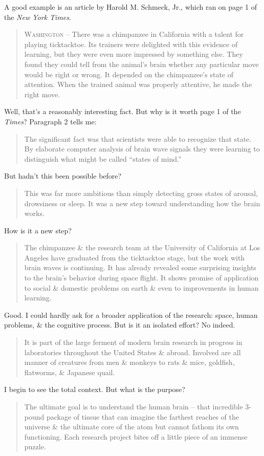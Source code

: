 \documentclass{article}
\begin{document}
A good example is an article by Harold M. Schmeck, Jr., which ran on page 1 of the \textit{New York Times}.
\begin{quotation}
	\textsc{Washington} -- There was a chimpanzee in California with a talent for playing ticktacktoe. Its trainers were delighted with this evidence of learning, but they were even more impressed by something else. They found they could tell from the animal's brain whether any particular move would be right or wrong. It depended on the chimpanzee's state of attention. When the trained animal was properly attentive, he made the right move.
\end{quotation}
Well, that's a reasonably interesting fact. But why is it worth page 1 of the \textit{Times}? Paragraph 2 tells me:
\begin{quotation}
	The significant fact was that scientists were able to recognize that state. By elaborate computer analysis of brain wave signals they were learning to distinguish what might be called ``states of mind.''
\end{quotation}
But hadn't this been possible before?
\begin{quotation}
	This was far more ambitious than simply detecting gross states of arousal, drowsiness or sleep. It was a new step toward understanding how the brain works.
\end{quotation}
How is it a new step?
\begin{quotation}
	The chimpanzee \& the research team at the University of California at Los Angeles have graduated from the ticktacktoe stage, but the work with brain waves is continuing. It has already revealed some surprising insights to the brain's behavior during space flight. It shows promise of application to social \& domestic problems on earth \& even to improvements in human learning.
\end{quotation}
Good. I could hardly ask for a broader application of the research: space, human problems, \& the cognitive process. But is it an isolated effort? No indeed.
\begin{quotation}
	It is part of the large ferment of modern brain research in progress in laboratories throughout the United States \& abroad. Involved are all manner of creatures from men \& monkeys to rats \& mice, goldfish, flatworms, \& Japanese quail.
\end{quotation}
I begin to see the total context. But what is the purpose?
\begin{quotation}
	The ultimate goal is to understand the human brain -- that incredible 3-pound package of tissue that can imagine the farthest reaches of the universe \& the ultimate core of the atom but cannot fathom its own functioning. Each research project bites off a little piece of an immense puzzle.
\end{quotation}
\end{document}

